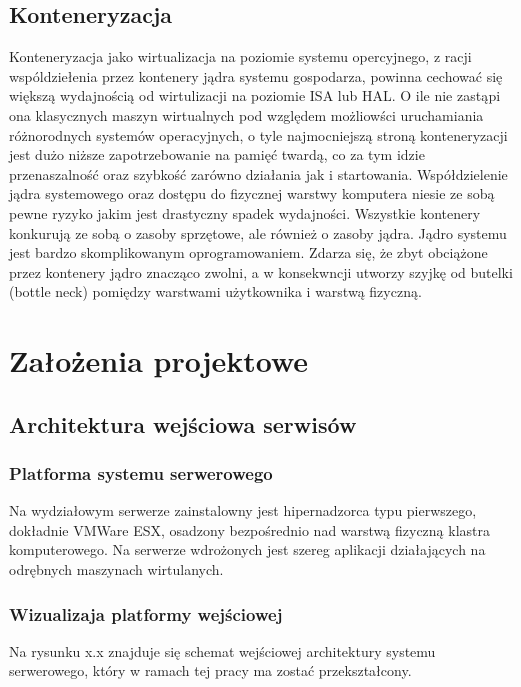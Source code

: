 \documentclass[polish, a4paper, 12pt, oneside]{book}
\begin{document}
\section{Konteneryzacja}
Konteneryzacja jako wirtualizacja na poziomie systemu opercyjnego, z racji wspóldziełenia przez kontenery jądra systemu gospodarza, powinna cechować się większą wydajnością od wirtulizacji na poziomie ISA lub HAL. O ile nie zastąpi ona klasycznych maszyn wirtualnych pod względem możliowści uruchamiania różnorodnych systemów operacyjnych, o tyle najmocniejszą stroną konteneryzacji jest dużo niższe zapotrzebowanie na pamięć twardą, co za tym idzie przenaszalność oraz szybkość zarówno działania jak i startowania. Współdzielenie jądra systemowego oraz dostępu do fizycznej warstwy komputera niesie ze sobą pewne ryzyko jakim jest drastyczny spadek wydajności. Wszystkie kontenery konkurują ze sobą o zasoby sprzętowe, ale również o zasoby jądra. Jądro systemu jest bardzo skomplikowanym oprogramowaniem. Zdarza się, że zbyt obciążone przez kontenery jądro znacząco zwolni, a w konsekwncji utworzy szyjkę od butelki (bottle neck) pomiędzy warstwami użytkownika i warstwą fizyczną.   


\chapter{Założenia projektowe}
\section{Architektura wejściowa serwisów}
\subsection{Platforma systemu serwerowego}
Na wydziałowym serwerze zainstalowny jest hipernadzorca typu pierwszego, dokładnie VMWare ESX, osadzony bezpośrednio nad warstwą fizyczną klastra komputerowego. Na serwerze wdrożonych jest szereg aplikacji działających na odrębnych maszynach wirtulanych. 

\subsection {Wizualizaja platformy wejściowej} Na rysunku x.x znajduje się schemat wejściowej architektury systemu serwerowego, który w ramach tej pracy ma zostać przekształcony.
\end{document}
